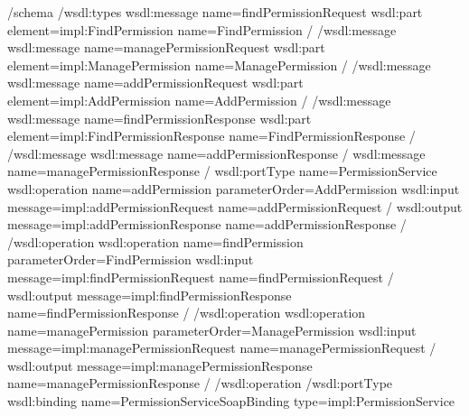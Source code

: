 \documentclass[letterpaper,10pt,english]{sphinxmanual}
\begin{document}
\begin{sphinxVerbatim}[commandchars=\\\{\}]
\PYGZlt{}/schema\PYGZgt{}
\PYGZlt{}/wsdl:types\PYGZgt{}
\PYGZlt{}wsdl:message name=\PYGZdq{}findPermissionRequest\PYGZdq{}\PYGZgt{}
\PYGZlt{}wsdl:part element=\PYGZdq{}impl:FindPermission\PYGZdq{} name=\PYGZdq{}FindPermission\PYGZdq{} /\PYGZgt{}
\PYGZlt{}/wsdl:message\PYGZgt{}
\PYGZlt{}wsdl:message name=\PYGZdq{}managePermissionRequest\PYGZdq{}\PYGZgt{}
\PYGZlt{}wsdl:part element=\PYGZdq{}impl:ManagePermission\PYGZdq{} name=\PYGZdq{}ManagePermission\PYGZdq{} /\PYGZgt{}
\PYGZlt{}/wsdl:message\PYGZgt{}
\PYGZlt{}wsdl:message name=\PYGZdq{}addPermissionRequest\PYGZdq{}\PYGZgt{}
\PYGZlt{}wsdl:part element=\PYGZdq{}impl:AddPermission\PYGZdq{} name=\PYGZdq{}AddPermission\PYGZdq{} /\PYGZgt{}
\PYGZlt{}/wsdl:message\PYGZgt{}
\PYGZlt{}wsdl:message name=\PYGZdq{}findPermissionResponse\PYGZdq{}\PYGZgt{}
\PYGZlt{}wsdl:part element=\PYGZdq{}impl:FindPermissionResponse\PYGZdq{} name=\PYGZdq{}FindPermissionResponse\PYGZdq{} /\PYGZgt{}
\PYGZlt{}/wsdl:message\PYGZgt{}
\PYGZlt{}wsdl:message name=\PYGZdq{}addPermissionResponse\PYGZdq{} /\PYGZgt{}
\PYGZlt{}wsdl:message name=\PYGZdq{}managePermissionResponse\PYGZdq{} /\PYGZgt{}
\PYGZlt{}wsdl:portType name=\PYGZdq{}PermissionService\PYGZdq{}\PYGZgt{}
\PYGZlt{}wsdl:operation name=\PYGZdq{}addPermission\PYGZdq{} parameterOrder=\PYGZdq{}AddPermission\PYGZdq{}\PYGZgt{}
\PYGZlt{}wsdl:input message=\PYGZdq{}impl:addPermissionRequest\PYGZdq{} name=\PYGZdq{}addPermissionRequest\PYGZdq{} /\PYGZgt{}
\PYGZlt{}wsdl:output message=\PYGZdq{}impl:addPermissionResponse\PYGZdq{} name=\PYGZdq{}addPermissionResponse\PYGZdq{} /\PYGZgt{}
\PYGZlt{}/wsdl:operation\PYGZgt{}
\PYGZlt{}wsdl:operation name=\PYGZdq{}findPermission\PYGZdq{} parameterOrder=\PYGZdq{}FindPermission\PYGZdq{}\PYGZgt{}
\PYGZlt{}wsdl:input message=\PYGZdq{}impl:findPermissionRequest\PYGZdq{} name=\PYGZdq{}findPermissionRequest\PYGZdq{} /\PYGZgt{}
\PYGZlt{}wsdl:output message=\PYGZdq{}impl:findPermissionResponse\PYGZdq{} name=\PYGZdq{}findPermissionResponse\PYGZdq{} /\PYGZgt{}
\PYGZlt{}/wsdl:operation\PYGZgt{}
\PYGZlt{}wsdl:operation name=\PYGZdq{}managePermission\PYGZdq{} parameterOrder=\PYGZdq{}ManagePermission\PYGZdq{}\PYGZgt{}
\PYGZlt{}wsdl:input message=\PYGZdq{}impl:managePermissionRequest\PYGZdq{} name=\PYGZdq{}managePermissionRequest\PYGZdq{} /\PYGZgt{}
\PYGZlt{}wsdl:output message=\PYGZdq{}impl:managePermissionResponse\PYGZdq{} name=\PYGZdq{}managePermissionResponse\PYGZdq{} /\PYGZgt{}
\PYGZlt{}/wsdl:operation\PYGZgt{}
\PYGZlt{}/wsdl:portType\PYGZgt{}
\PYGZlt{}wsdl:binding name=\PYGZdq{}PermissionServiceSoapBinding\PYGZdq{} type=\PYGZdq{}impl:PermissionService\PYGZdq{}\PYGZgt{}

\end{sphinxVerbatim}
\end{document}
